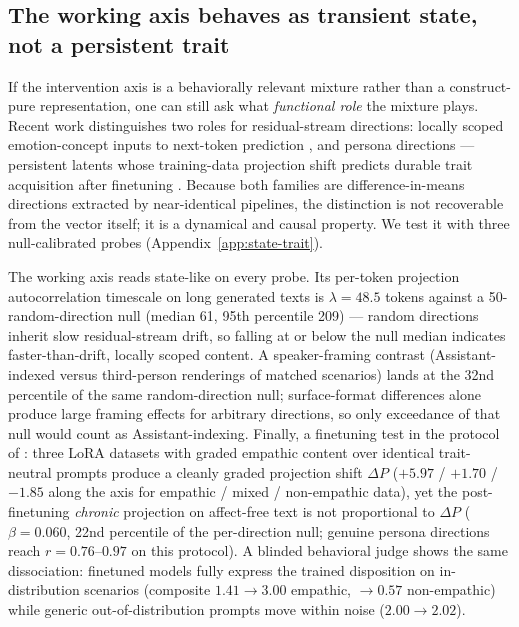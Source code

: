 

\subsection{The working axis behaves as transient state, not a persistent trait}
\label{sec:state-trait}

If the intervention axis is a behaviorally relevant mixture rather than a
construct-pure representation, one can still ask what \emph{functional role}
the mixture plays. Recent work distinguishes two roles for residual-stream
directions: locally scoped emotion-concept inputs to next-token prediction
\cite{sofroniew2026emotion}, and persona directions --- persistent latents
whose training-data projection shift predicts durable trait acquisition after
finetuning \cite{chen2025persona}. Because both families are difference-in-means
directions extracted by near-identical pipelines, the distinction is not
recoverable from the vector itself; it is a dynamical and causal property. We
test it with three null-calibrated probes (Appendix~\ref{app:state-trait}).

The working axis reads state-like on every probe. Its per-token projection
autocorrelation timescale on long generated texts is $\lambda = 48.5$ tokens
against a 50-random-direction null (median 61, 95th percentile 209) --- random
directions inherit slow residual-stream drift, so falling at or below the null
median indicates faster-than-drift, locally scoped content. A speaker-framing
contrast (Assistant-indexed versus third-person renderings of matched
scenarios) lands at the 32nd percentile of the same random-direction null;
surface-format differences alone produce large framing effects for arbitrary
directions, so only exceedance of that null would count as Assistant-indexing.
Finally, a finetuning test in the protocol of \cite{chen2025persona}: three
LoRA datasets with graded empathic content over identical trait-neutral
prompts produce a cleanly graded projection shift $\Delta P$
($+5.97$ / $+1.70$ / $-1.85$ along the axis for empathic / mixed /
non-empathic data), yet the post-finetuning \emph{chronic}
projection on affect-free text is not proportional to $\Delta P$
($\beta = 0.060$, 22nd percentile of the per-direction null; genuine persona
directions reach $r = 0.76$--$0.97$ on this protocol). A blinded behavioral
judge shows the same dissociation: finetuned models fully express the trained
disposition on in-distribution scenarios (composite $1.41 \to 3.00$ empathic,
$\to 0.57$ non-empathic) while generic out-of-distribution prompts move
within noise ($2.00 \to 2.02$).

